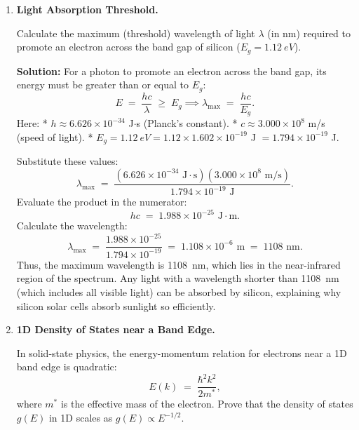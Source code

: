 \documentclass[12pt, a4paper]{book}
\begin{document}
\begin{problembox}
\begin{enumerate}[label=\textbf{E\arabic*.}]
  \item \textbf{Light Absorption Threshold.}
  
        Calculate the maximum (threshold) wavelength of light $\lambda$ (in nm) required to promote an electron across the band gap of silicon ($E_g = \SI{1.12}{eV}$).
        
        \textbf{Solution:}
        For a photon to promote an electron across the band gap, its energy must be greater than or equal to $E_g$:
        \[
          E \;=\; \frac{h c}{\lambda} \;\ge\; E_g \implies \lambda_{\text{max}} \;=\; \frac{h c}{E_g}.
        \]
        Here:
        * $h \approx 6.626 \times 10^{-34}$ J$\cdot$s (Planck's constant).
        * $c \approx 3.000 \times 10^8$ m/s (speed of light).
        * $E_g = \SI{1.12}{eV} = 1.12 \times 1.602 \times 10^{-19}$ J $= 1.794 \times 10^{-19}$ J.
        
        Substitute these values:
        \[
          \lambda_{\text{max}} \;=\; \frac{\left( 6.626 \times 10^{-34} \text{ J}\cdot\text{s} \right) \left( 3.000 \times 10^8 \text{ m/s} \right)}{1.794 \times 10^{-19} \text{ J}}.
        \]
        Evaluate the product in the numerator:
        \[
          h c \;=\; 1.988 \times 10^{-25} \text{ J}\cdot\text{m}.
        \]
        Calculate the wavelength:
        \[
          \lambda_{\text{max}} \;=\; \frac{1.988 \times 10^{-25}}{1.794 \times 10^{-19}} \;=\; 1.108 \times 10^{-6} \text{ m} \;=\; 1108 \text{ nm}.
        \]
        Thus, the maximum wavelength is \SI{1108}{nm}, which lies in the near-infrared region of the spectrum.
        Any light with a wavelength shorter than \SI{1108}{nm} (which includes all visible light) can be absorbed by silicon, explaining why silicon solar cells absorb sunlight so efficiently.
        
  \item \textbf{1D Density of States near a Band Edge.}
  
        In solid-state physics, the energy-momentum relation for electrons near a 1D band edge is quadratic:
        \[
          E(k) \;=\; \frac{\hbar^2 k^2}{2m^*},
        \]
        where $m^*$ is the effective mass of the electron.
        Prove that the density of states $g(E)$ in 1D scales as $g(E) \propto E^{-1/2}$.
        

\end{enumerate}
\end{problembox}
\end{document}
